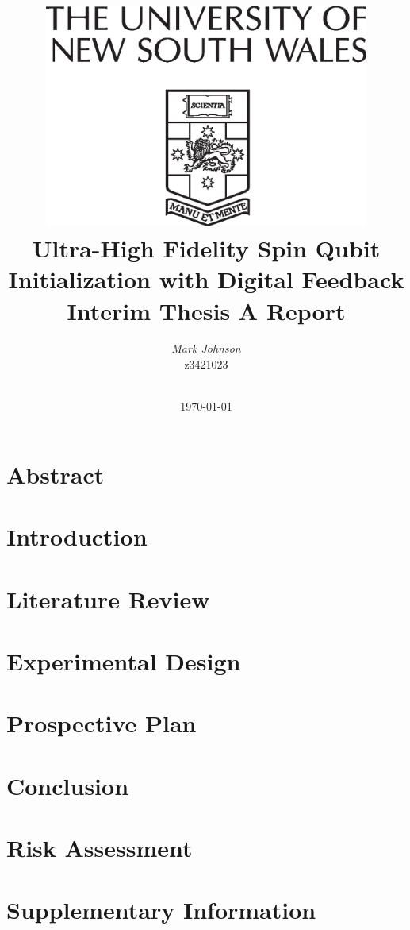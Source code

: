 \documentclass[a4paper, english, twoside, 12pt]{article}
\title{
	\centering\includegraphics[width=0.8\textwidth]{Arms-vl}\\
	\vspace{1cm}
	\Huge \textbf{Ultra-High Fidelity Spin Qubit Initialization with Digital Feedback}\\
	\vspace{1cm}
    \huge Interim Thesis A Report
	}
\author{\Huge \emph{Mark Johnson}\\
        \Large z3421023 \\\\ 
        }
\date{\today} %
\begin{document}
%
%

\thispagestyle{empty}

\pagebreak


\listoftodos

\pagebreak

\tableofcontents
\listoffigures
\listoftables

\pagebreak

\section{Abstract}

\section{Introduction}

\section{Literature Review}

\section{Experimental Design}

\section{Prospective Plan}

\section{Conclusion}




\begin{appendices} 
	\section{Risk Assessment}
	
	\section{Supplementary Information}
	
\end{appendices}
\end{document}
